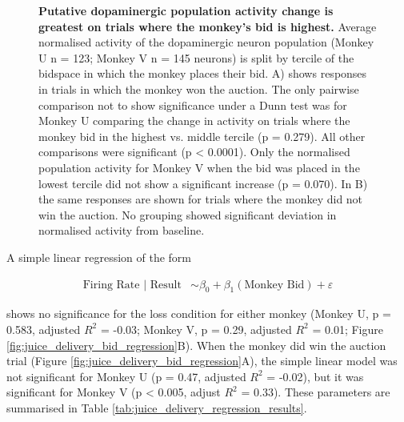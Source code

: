 \begin{figure}[p] 
\centering    

\caption[Putative dopaminergic population activity change is greatest on trials where the monkey's bid is highest.]{\textbf{Putative dopaminergic population activity change is greatest on trials where the monkey's bid is highest.} Average normalised activity of the dopaminergic neuron population (Monkey U n = 123; Monkey V n = 145 neurons) is split by tercile of the bidspace in which the monkey places their bid. A) shows responses in trials in which the monkey won the auction. The only pairwise comparison not to show significance under a Dunn test was for Monkey U comparing the change in activity on trials where the monkey bid in the highest vs. middle tercile (p = 0.279). All other comparisons were significant (p < 0.0001). Only the normalised population activity for Monkey V when the bid was placed in the lowest tercile did not show a significant increase (p = 0.070). In B) the same responses are shown for trials where the monkey did not win the auction. No grouping showed significant deviation in normalised activity from baseline.}
\label{fig:juice_delivery_bid}
\end{figure}

A simple linear regression of the form 

\begin{align}
\text{Firing Rate | Result} &\sim \beta_0 + \beta_1(\text{Monkey Bid}) + \varepsilon \label{eq:firing_rate_mbid_regression}
\end{align}

shows no significance for the loss condition for either monkey (Monkey U, p = 0.583, adjusted $R^2$ = -0.03; Monkey V, p = 0.29, adjusted $R^2$ = 0.01; Figure \ref{fig:juice_delivery_bid_regression}B). When the monkey did win the auction trial (Figure \ref{fig:juice_delivery_bid_regression}A), the simple linear model was not significant for Monkey U (p = 0.47, adjusted $R^2$ = -0.02), but it was significant for Monkey V (p < 0.005, adjust $R^2$ = 0.33). These parameters are summarised in Table \ref{tab:juice_delivery_regression_results}.


